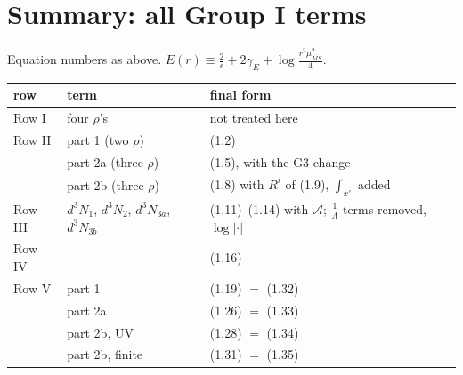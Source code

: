 \documentclass[9pt]{article}
\numberwithin{equation}{section}
\begin{document}
\section*{Summary: all Group I terms}
Equation numbers as above. $E(r)\equiv\frac{2}{\epsilon}+2\gamma_{E}+\log\frac{r^{2}\mu^{2}_{\overline{MS}}}{4}$.
\begin{center}
\begin{tabular}{lll}
\hline
row & term & final form\\
\hline
Row I & four $\rho$'s & not treated here\\
Row II & part 1 (two $\rho$) & (1.2)\\
 & part 2a (three $\rho$) & (1.5), with the G3 change\\
 & part 2b (three $\rho$) & (1.8) with $R^{i}$ of (1.9), $\int_{x'}$ added\\
Row III & $d^{3}N_{1}$, $d^{3}N_{2}$, $d^{3}N_{3a}$, $d^{3}N_{3b}$ & (1.11)--(1.14) with $\mathcal{A}$; $\frac{1}{\Lambda}$ terms removed, $\log|\cdot|$\\
Row IV & & (1.16)\\
Row V & part 1 & (1.19) $=$ (1.32)\\
 & part 2a & (1.26) $=$ (1.33)\\
 & part 2b, UV & (1.28) $=$ (1.34)\\
 & part 2b, finite & (1.31) $=$ (1.35)\\
\hline
\end{tabular}
\end{center}
\end{document}
